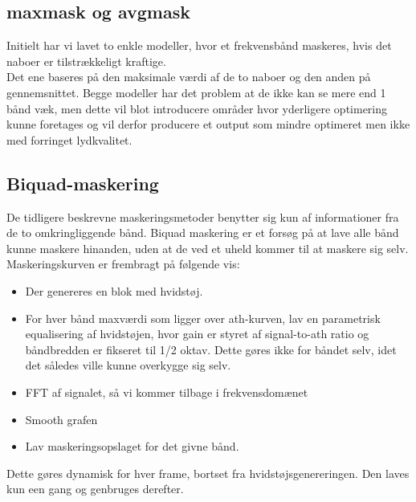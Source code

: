 \subsection*{maxmask og avgmask}
Initielt har vi lavet to enkle modeller, hvor et frekvensbånd
maskeres, hvis det naboer er tilstrækkeligt kraftige.\\
Det ene baseres på den maksimale værdi af de to naboer og den anden på
gennemsnittet. Begge modeller har det problem at de ikke kan se mere
end 1 bånd væk, men dette vil blot introducere områder hvor yderligere
optimering kunne foretages og vil derfor producere et output som
mindre optimeret men ikke med forringet lydkvalitet.

\subsection*{Biquad-maskering}
De tidligere beskrevne maskeringsmetoder benytter sig kun af
informationer fra de to omkringliggende bånd. Biquad maskering er et
forsøg på at lave alle bånd kunne maskere hinanden, uden at de ved et
uheld kommer til at maskere sig selv.\\
Maskeringskurven er frembragt på følgende vis:
\begin{itemize}
\item Der genereres en blok med hvidstøj.
\item For hver bånd maxværdi som ligger over ath-kurven, lav en parametrisk
  equalisering af hvidstøjen, hvor gain er styret af signal-to-ath
  ratio og båndbredden er fikseret til 1/2 oktav. Dette gøres ikke for
  båndet selv, idet det således ville kunne overkygge sig selv.
\item FFT af signalet, så vi kommer tilbage i frekvensdomænet
\item Smooth grafen
\item Lav maskeringsopslaget for det givne bånd.
\end{itemize}
Dette gøres dynamisk for hver frame, bortset fra
hvidstøjsgenereringen. Den laves kun een gang og genbruges derefter.

